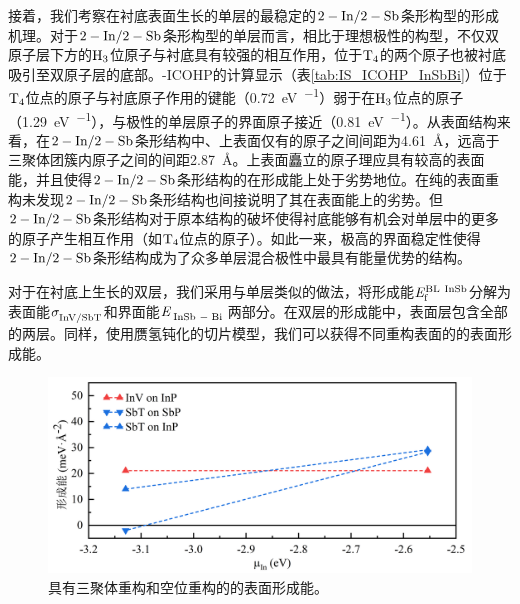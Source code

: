 接着，我们考察在衬底表面生长的单层的最稳定的$\rm 2-In/2-Sb$条形构型的形成机理。对于$\rm 2-In/2-Sb$条形构型的单层而言，相比于理想极性的构型，不仅双原子层下方的$\rm H_{3} \it$位原子与衬底具有较强的相互作用，位于$\rm T_{4} \it$的两个原子也被衬底吸引至双原子层的底部。-ICOHP的计算显示（表\ref{tab:IS_ICOHP_InSbBi}）位于$\rm T_{4} \it$位点的原子与衬底原子作用的键能（\SI{0.72}{\electronvolt\per\pair}）弱于在$\rm H_{3} \it$位点的原子（\SI{1.29}{\electronvolt\per\pair}），与极性的单层原子的界面原子接近（\SI{0.81}{\electronvolt\per\pair}）。从表面结构来看，在$\rm 2-In/2-Sb$条形结构中、上表面仅有的原子之间间距为\SI{4.61}{\angstrom}，远高于三聚体团簇内原子之间的间距\SI{2.87}{\angstrom}。上表面矗立的原子理应具有较高的表面能，并且使得$\rm 2-In/2-Sb$条形结构的在形成能上处于劣势地位。在纯的表面重构未发现$\rm 2-In/2-Sb$条形结构也间接说明了其在表面能上的劣势。但$\rm 2-In/2-Sb$条形结构对于原本结构的破坏使得衬底能够有机会对单层中的更多的原子产生相互作用（如$\rm T_{4} \it$位点的原子）。如此一来，极高的界面稳定性使得$\rm 2-In/2-Sb$条形结构成为了众多单层混合极性中最具有能量优势的结构。

对于在衬底上生长的双层，我们采用与单层类似的做法，将形成能$\it E_{\rm f}^{\rm BL\ InSb} \it$分解为表面能$\it \sigma_{\rm InV/ SbT}^{\rm } \it$和界面能$\energyVar{\cemb{InSb}-\cemb{Bi}}{}$两部分。在双层的形成能中，表面层包含全部的两层。同样，使用赝氢钝化的切片模型，我们可以获得不同重构表面的的表面形成能。

\begin{figure}[htb]
    \includegraphics{pic/IS_DFT_surfaceE_InVSbT.png}
    \caption{具有三聚体重构和空位重构的的表面形成能。}
    \label{fig:IS_DFT_surfaceE_InVSbT}
\end{figure}

